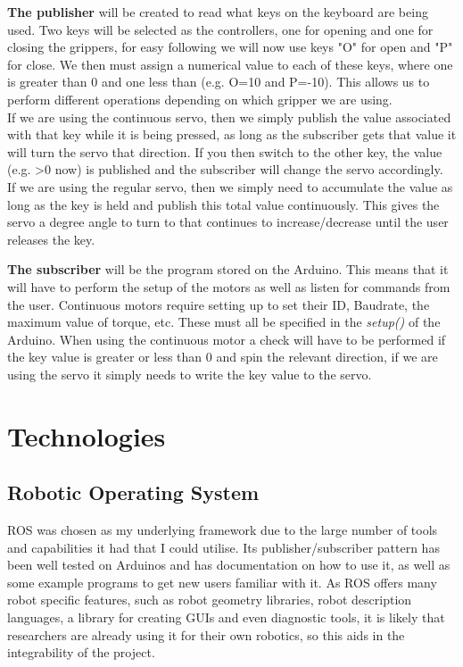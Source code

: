 \documentclass{l4proj}
\begin{document}
\textbf{The publisher} will be created to read what keys on the keyboard are being used. Two keys will be selected as the controllers, one for opening and one for closing the grippers, for easy following we will now use keys "O" for open and "P" for close. We then must assign a numerical value to each of these keys, where one is greater than 0 and one less than (e.g. O=10 and P=-10). This allows us to perform different operations depending on which gripper we are using.\\
If we are using the continuous servo, then we simply publish the value associated with that key while it is being pressed, as long as the subscriber gets that value it will turn the servo that direction. If you then switch to the other key, the value (e.g. >0 now) is published and the subscriber will change the servo accordingly. \\
If we are using the regular servo, then we simply need to accumulate the value as long as the key is held and publish this total value continuously. This gives the servo a degree angle to turn to that continues to increase/decrease until the user releases the key. 

\textbf{The subscriber} will be the program stored on the Arduino. This means that it will have to perform the setup of the motors as well as listen for commands from the user. Continuous motors require setting up to set their ID, Baudrate, the maximum value of torque, etc. These must all be specified in the \textit{setup()} of the Arduino. When using the continuous motor a check will have to be performed if the key value is greater or less than 0 and spin the relevant direction, if we are using the servo it simply needs to write the key value to the servo. \\

\section{Technologies}
\subsection{Robotic Operating System}
ROS was chosen as my underlying framework due to the large number of tools and capabilities it had that I could utilise. Its publisher/subscriber pattern has been well tested on Arduinos and has documentation on how to use it, as well as some example programs to get new users familiar with it. As ROS offers many robot specific features, such as robot geometry libraries, robot description languages, a library for creating GUIs and even diagnostic tools, it is likely that researchers are already using it for their own robotics, so this aids in the integrability of the project. 
\end{document}
